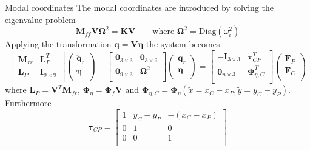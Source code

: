 \documentclass{beamer}
\begin{document}
\begin{frame}{Modal coordinates}
The modal coordinates are introduced by solving the eigenvalue problem \begin{equation*}
	\bm{M}_{ff} \bm{V}\bm{\Omega}^2  = \bm{K} \bm{V} \qquad \text{where } \bm{\Omega}^2 = \text{Diag}(\omega_i^2)
\end{equation*}
Applying the transformation $\bm{q} = \bm{V} \bm{\eta}$ the system becomes
\small{
\begin{equation*}
\begin{bmatrix}
\bm{M}_{rr} & \bm{L}_{P}^T\\
\bm{L}_{P} & \bm{I}_{9 \times 9}\\
\end{bmatrix}
\begin{pmatrix}
\ddot{\bm{q}}_{r}\\
\ddot{\bm{\eta}}\\
\end{pmatrix} + 
\begin{bmatrix}
\bm{0}_{3 \times 3} & \bm{0}_{3 \times 9}\\
\bm{0}_{9 \times 3} & \bm{\Omega}^2\\
\end{bmatrix}
\begin{pmatrix}
{\bm{q}}_{r}\\
{\bm{\eta}}\\
\end{pmatrix} = 
\begin{bmatrix}
- \bm{I}_{3 \times 3} & \bm{\tau}_{CP}^T \\
\bm{0}_{n \times 3}   &\bm\Phi_{\eta, C}^T	\\
\end{bmatrix}\begin{pmatrix}
\bm{F}_P\\
\bm{F}_C\\
\end{pmatrix}
\end{equation*}
}
where $\bm{L}_{P} = \bm{V}^T \bm{M}_{fr}$, $\bm\Phi_{\eta} = \bm\Phi_f \bm{V}$ and $\bm\Phi_{\eta, C} = \bm\Phi_{\eta}(\widetilde{x} = x_C - x_P, \widetilde{y} = y_C - y_P)$. Furthermore
\begin{equation*}
	\bm{\tau}_{CP} = \begin{bmatrix}
	1 & y_C-y_P & -(x_C - x_P) \\
	0 & 1 & 0 \\
	0 & 0 & 1 \\ 
	\end{bmatrix}
\end{equation*}

\end{frame}
\end{document}
